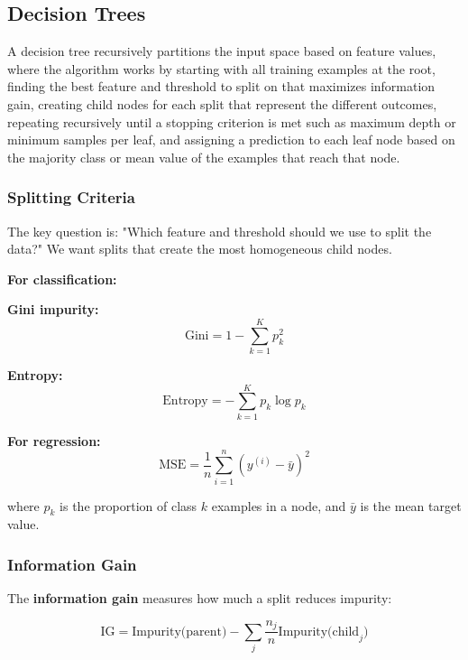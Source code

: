 \subsection{Decision Trees}

A decision tree recursively partitions the input space based on feature values, where the algorithm works by starting with all training examples at the root, finding the best feature and threshold to split on that maximizes information gain, creating child nodes for each split that represent the different outcomes, repeating recursively until a stopping criterion is met such as maximum depth or minimum samples per leaf, and assigning a prediction to each leaf node based on the majority class or mean value of the examples that reach that node.

\subsubsection{Splitting Criteria}

The key question is: "Which feature and threshold should we use to split the data?" We want splits that create the most homogeneous child nodes.

\textbf{For classification:}

\textbf{Gini impurity:}
\begin{equation}
\text{Gini} = 1 - \sum_{k=1}^{K} p_k^2
\end{equation}

\textbf{Entropy:}
\begin{equation}
\text{Entropy} = -\sum_{k=1}^{K} p_k \log p_k
\end{equation}

\textbf{For regression:}
\begin{equation}
\text{MSE} = \frac{1}{n} \sum_{i=1}^{n} (y^{(i)} - \bar{y})^2
\end{equation}

where $p_k$ is the proportion of class $k$ examples in a node, and $\bar{y}$ is the mean target value.

\subsubsection{Information Gain}

The \textbf{information gain} measures how much a split reduces impurity:

\begin{equation}
\text{IG} = \text{Impurity(parent)} - \sum_{j} \frac{n_j}{n} \text{Impurity(child}_j\text{)}
\end{equation}

